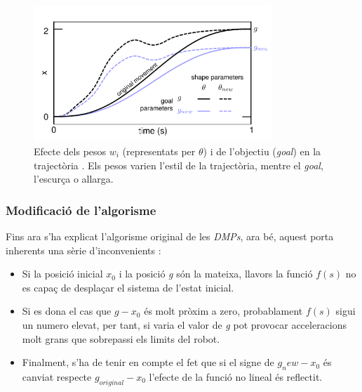 \documentclass[12pt,a4paper,final,twoside]{report}
\begin{document}
\begin{figure}[tb]
\centering
\includegraphics[width=0.8\textwidth]{Imatges/effect-of-shape-parameters.png}
\caption[Efecte dels pesos $w_i$ (representats per $\theta$) i de l'objectiu (\textit{goal})]{Efecte dels pesos $w_i$ (representats per $\theta$) i de l'objectiu (\textit{goal}) en la trajectòria \cite{Stulp2011}. Els pesos varien l'estil de la trajectòria, mentre el \textit{goal}, l'escurça o allarga.}
\label{fig:ffect-of-shape-parameters}
\end{figure}


\subsubsection{Modificació de l'algorisme}

Fins ara s'ha explicat l'algorisme original de les \textit{DMPs}, ara bé, aquest porta inherents una sèrie d'inconvenients \cite{Pastor2009}:

\begin{itemize}
\item Si la posició inicial $x_0$ i la posició \textit{g} són la mateixa, llavors la funció $f(s)$ no es capaç de desplaçar el sistema de l'estat inicial.

\item Si es dona el cas que $g-x_0$ és molt pròxim a zero, probablament $f(s)$ sigui un numero elevat, per tant, si varia el valor de \textit{g} pot provocar acceleracions molt grans que sobrepassi els limits del robot.

\item Finalment, s'ha de tenir en compte el fet que si el signe de $g_new - x_0$ és canviat respecte $g_{original} - x_0$ l'efecte de la funció no lineal és reflectit.
\end{itemize}
\end{document}
